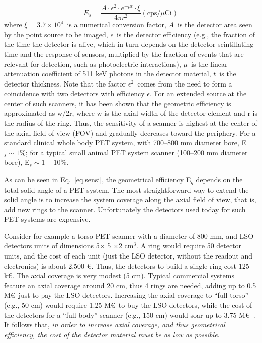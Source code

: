 \documentclass[review]{elsarticle}
\begin{document}
\begin{equation}
E_s = \frac{A \cdot \epsilon^2 \cdot e^{-\mu t} \cdot \xi}{4 \pi r^2} (\mathrm{cps}/\mu \mathrm{Ci})
\label{eq.sensi}
\end{equation}
%
where $\xi = 3.7 \times 10^4$~is a numerical conversion factor, $A$~is the detector area seen by the point source to be imaged, $\epsilon$~is the detector efficiency (e.g., the fraction of the time the detector is alive, which in turn depends on the detector scintillating time and the response of sensors, multiplied by the fraction of events that are relevant for detection, such as photoelectric interactions), $\mu$~is the linear attenuation coefficient of 511 keV photons in the detector material, $t$~is the detector thickness. Note that the factor $\epsilon^2$~comes from the need to form a coincidence with two detectors with efficiency $\epsilon$. For an extended source at the center of such scanners, it has been shown that the geometric efficiency is approximated as w/2r, where w is the axial width of the detector element and r is the radius of the ring. Thus, the sensitivity of a scanner is highest at the center of the axial field-of-view (FOV) and gradually decreases toward the periphery.
For a standard clinical whole body PET
system, with 700--800 mm diameter bore, E$_s \sim 1$\%; for a typical
small animal PET system scanner (100--200 mm diameter bore), E$_s \sim 1-10$\%.

As can be seen in Eq.~\ref{eq.sensi}, the geometrical efficiency E$_g$ depends on the total solid angle of a PET system.  The most straightforward way to extend the solid angle is to increase the system
coverage along the axial field of view, that is, add new rings to the scanner. Unfortunately the detectors used today for such PET systems are expensive.

Consider for example a torso PET scanner with a diameter of 800 mm, and LSO detectors units of dimensions 5$\times$ 5 $\times $2 cm$^3$. A ring would require 50 detector units, and the cost of each unit (just the LSO detector, without the readout and electronics) is about 2,500 \euro. Thus, the detectors to build a single ring cost 125 k\euro. The axial coverage is very modest (5 cm). Typical commercial systems feature an axial coverage around 20 cm, thus 4 rings are needed,  adding up to 0.5 M\euro\ just to pay the LSO detectors. Increasing the axial coverage to ``full torso'' (e.g., 50 cm) would require 1.25 M\euro\ to buy the LSO detectors, while the cost of the detectors for a ``full body'' scanner (e.g., 150 cm) would soar up to 3.75 M\euro\ . It follows that, {\em in order to increase axial coverage, and thus geometrical efficiency, the cost of the detector material must be as low as possible}.
\end{document}
